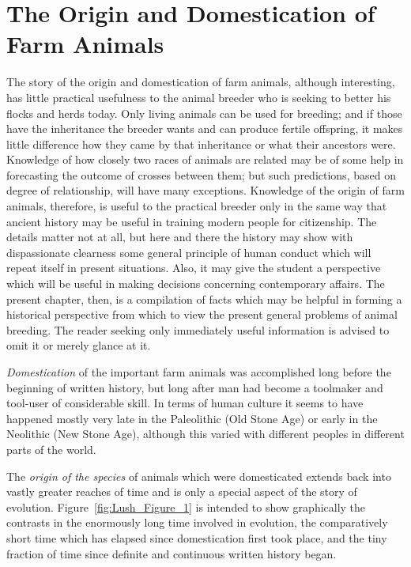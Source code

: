 
\chapter{The Origin and Domestication of Farm Animals}
\label{cha:origin-and-domestication}

The story of the origin and domestication of farm animals, although interesting, has little practical
usefulness to the animal breeder who is seeking to better his flocks and herds today. Only living
animals can be used for breeding; and if those have the inheritance the breeder wants and can produce
fertile offspring, it makes little difference how they came by that inheritance or what their ancestors
were. Knowledge of how closely two races of animals are related may be of some help in forecasting the
outcome of crosses between them; but such predictions, based on degree of relationship, will have many
exceptions. Knowledge of the origin of farm animals, therefore, is useful to the practical breeder only
in the same way that ancient history may be useful in training modern people for citizenship. The 
details matter not at all, but here and there the history may show with dispassionate clearness some 
general principle of human conduct which will repeat itself in present situations. Also, it may give 
the student a perspective which will be useful in making decisions concerning contemporary affairs. The 
present chapter, then, is a compilation of facts which may be helpful in forming a historical 
perspective from which to view the present general problems of animal breeding. The reader seeking 
only immediately useful information is advised to omit it or merely glance at it.

\textit{Domestication} of the important farm animals was accomplished long before the beginning of written
history, but long after man had become a toolmaker and tool-user of considerable skill. In terms of human
culture it seems to have happened mostly very late in the Paleolithic (Old Stone Age) or early in the
Neolithic (New Stone Age), although this varied with different peoples in different parts of the world.

The \textit{origin of the species} of animals which were domesticated extends back into vastly greater
reaches of time and is only a special aspect of the story of evolution. Figure~\ref{fig:Lush_Figure_1} is intended to show
graphically the contrasts in the enormously long time involved in evolution, the comparatively short
time which has elapsed since domestication first took place, and the tiny fraction of time since definite
and continuous written history began.

